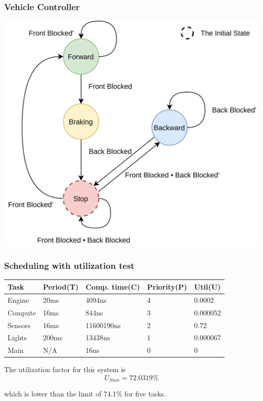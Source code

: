 \documentclass{beamer}
\begin{document}
    \begin{frame}
        \frametitle{Vehicle Controller}
        \centering
        \includegraphics[scale=0.06, keepaspectratio]{img/finite-state-machine2.png}
    \end{frame}

    \begin{frame}
        \frametitle{Scheduling with utilization test}
        \begin{center}
            \begin{tabular}{||l l l l|l||}
                \hline
                Task & Period(T) & Comp. time(C) & Priority(P) & Util(U) \\ [0.5ex]
                \hline\hline
                Engine & 20ms & 4094ns & 4 & 0.0002 \\
                \hline
                Compute & 16ms & 844ns & 3 & 0.000052 \\
                \hline
                Sensors & 16ms & 11600190ns & 2 & 0.72 \\
                \hline
                Lights & 200ms & 13438ns & 1 & 0.000067 \\
                \hline
                Main & N/A & 16ns & 0 & 0 \\ [1ex]
                \hline
            \end{tabular}
        \end{center}

        The utilization factor for this system is
        \begin{equation*}
            U_{Sum} = 72.0319\%
        \end{equation*}

        which is lower than the limit of 74.1\% for five tasks.
    \end{frame}
\end{document}
